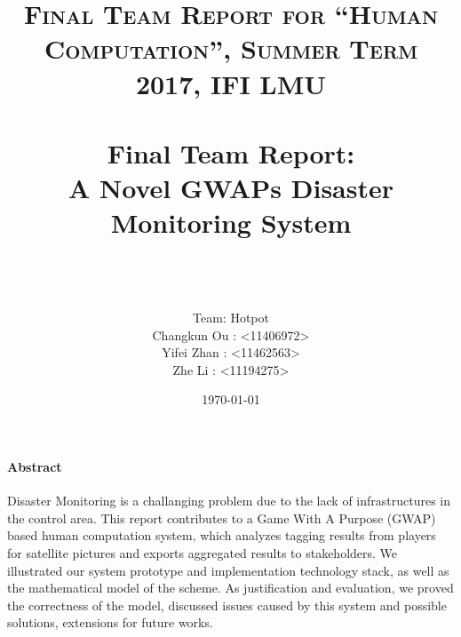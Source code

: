 \documentclass[paper=a4, fontsize=11pt]{scrartcl}
\title{	
\normalfont \normalsize 
\textsc{Final Team Report for ``Human Computation'', Summer Term 2017, IFI LMU} \\ [25pt]
\horrule{0.5pt} \\[0.4cm]
\huge Final Team Report: \\
A Novel GWAPs Disaster Monitoring System\\
\horrule{2pt} \\[0.5cm] %
}
\author{
  \\ Team: Hotpot\\
  Changkun Ou : <11406972> \\
  Yifei Zhan : <11462563> \\
  Zhe Li : <11194275>  }
\date{\today}
\theoremstyle{definition}
\numberwithin{equation}{section}
\numberwithin{figure}{section}
\numberwithin{table}{section}
\begin{document}
\maketitle
\tableofcontents

\paragraph{Abstract}
Disaster Monitoring is a challanging problem due to the lack of infrastructures in the control area.
This report contributes to a Game With A Purpose (GWAP) based human computation system, 
which analyzes tagging results from players for satellite pictures and exports aggregated results to stakeholders. 
We illustrated our system prototype and implementation technology stack, as well as the mathematical model of the scheme. 
As justification and evaluation, we proved the correctness of the model, 
discussed issues caused by this system and possible solutions, extensions for future works.







\nocite{*}


\end{document}
